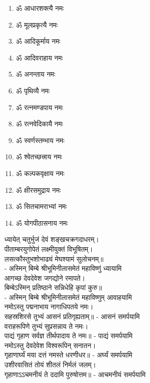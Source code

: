 \begin{multicols}{2}
\begin{enumerate}
\item ॐ आधारशक्त्यै नमः
\item ॐ मूलप्रकृत्यै नमः
\item ॐ आदिकूर्माय नमः 
\item ॐ आदिवराहाय नमः
\item ॐ अनन्ताय नमः
\item ॐ पृथिव्यै नमः
\item ॐ रत्नमण्डपाय नमः
\item ॐ रत्नवेदिकायै नमः
\item ॐ स्वर्णस्तम्भाय नमः
\item ॐ श्वेतच्छत्त्राय नमः
\item ॐ कल्पकवृक्षाय नमः
\item ॐ क्षीरसमुद्राय नमः 
\item ॐ सितचामराभ्यां नमः
\item ॐ योगपीठासनाय नमः
\end{enumerate}
\end{multicols}
 ध्यायेत् चतुर्भुजं देवं शङ्खचक्रगदाधरम्।\\
पीताम्बरयुगोपेतं लक्ष्मीयुक्तं विभूषितम्। \\
लसत्कौस्तुभशोभाढ्यं मेघश्यामं सुलोचनम्॥\\
- अस्मिन् बिम्बे श्रीभूमिनीलासमेतं महाविष्णुं ध्यायामि\\

आगच्छ देवदेवेश जगद्योने रमापते।\\
बिम्बेऽस्मिन् प्रतिष्ठाने सन्निधेहि कृपां कुरु॥\\
- अस्मिन् बिम्बे श्रीभूमिनीलासमेतं महाविष्णुम् आवाहयामि\\

नमोऽस्तु पद्मनाभाय नागाधिपतये नमः।\\
सहस्रशिरसे तुभ्यं आसनं प्रतिगृह्यताम्॥ - आसनं समर्पयामि\\

वराहरूपिणे तुभ्यं सुप्रसन्नाय ते नमः।\\
पाद्यं गृहाण सर्वज्ञ तीर्थपादाय ते नमः॥ - पाद्यं समर्पयामि\\
 
नमोऽस्तु देवदेवेश विश्वरूपिन् सनातन।\\
गृहाणार्घ्यं मया दत्तं नमस्ते धरणीधर॥ - अर्घ्यं समर्पयामि\\

उशीरवासितं तोयं शीतलं निर्मलं जलम्।\\
गृहाणाऽऽचमनीयं ते ददामि पुरुषोत्तम॥ - आचमनीयं समर्पयामि\\

